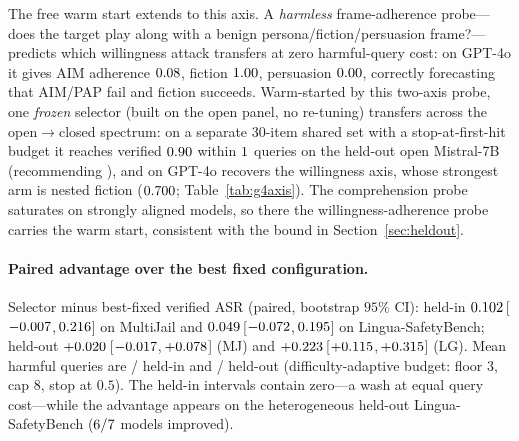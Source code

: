 \documentclass{article}
\begin{document}
The free warm start extends to this axis. A \emph{harmless} frame-adherence probe---does the target play
along with a benign persona/fiction/persuasion frame?---predicts which willingness attack transfers at
zero harmful-query cost: on GPT-4o it gives AIM adherence $0.08$, fiction $1.00$,
persuasion $0.00$, correctly forecasting that AIM/PAP fail and fiction succeeds. Warm-started by
this two-axis probe, one \emph{frozen} selector (built on the open panel, no re-tuning) transfers across
the open$\to$closed spectrum: on a separate $30$-item shared set with a stop-at-first-hit budget it reaches
verified $0.90$ within $1$ queries on the held-out open Mistral-7B (recommending
\texttt{\pjcapmbest}), and on GPT-4o recovers the willingness axis, whose strongest arm is nested fiction
($0.700$; Table~\ref{tab:g4axis}). The comprehension probe saturates on
strongly aligned models, so there the willingness-adherence probe carries the warm start, consistent with
the bound in Section~\ref{sec:heldout}.


\paragraph{Paired advantage over the best fixed configuration.}\label{app:paireddelta}
Selector minus best-fixed verified ASR (paired, bootstrap $95\%$ CI): held-in $0.102$\,[$-0.007$,\,$0.216$] on MultiJail and $0.049$\,[$-0.072$,\,$0.195$] on Lingua-SafetyBench; held-out $+0.020$\,[$-0.017$,\,$+0.078$] (MJ) and $+0.223$\,[$+0.115$,\,$+0.315$] (LG). Mean harmful queries are \pjqbarMJ{}/\pjqbarLG{} held-in and \pjhoMJadaptq{}/\pjhoLGadaptq{} held-out (difficulty-adaptive budget: floor $3$, cap $8$, stop at $0.5$). The held-in intervals contain zero---a wash at equal query cost---while the advantage appears on the heterogeneous held-out Lingua-SafetyBench ($6/7$ models improved).
\end{document}

